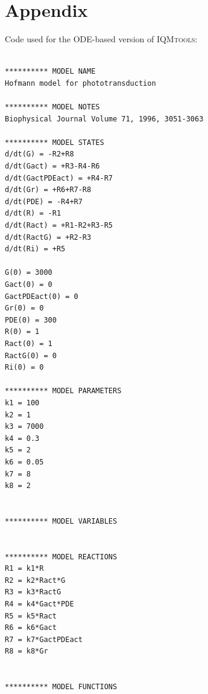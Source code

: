 \documentclass[pdf, color,12pt]{CITnote}
\begin{document}
\section{{\large Appendix}}
Code used for the ODE-based version of \textsc{IQMtools}:
\\
\\
\begin{lstlisting}
********** MODEL NAME
Hofmann model for phototransduction

********** MODEL NOTES
Biophysical Journal Volume 71, 1996, 3051-3063

********** MODEL STATES
d/dt(G) = -R2+R8 
d/dt(Gact) = +R3-R4-R6 
d/dt(GactPDEact) = +R4-R7 
d/dt(Gr) = +R6+R7-R8 
d/dt(PDE) = -R4+R7 
d/dt(R) = -R1 
d/dt(Ract) = +R1-R2+R3-R5 
d/dt(RactG) = +R2-R3 
d/dt(Ri) = +R5 

G(0) = 3000
Gact(0) = 0
GactPDEact(0) = 0
Gr(0) = 0
PDE(0) = 300
R(0) = 1
Ract(0) = 1
RactG(0) = 0
Ri(0) = 0

********** MODEL PARAMETERS
k1 = 100 
k2 = 1 
k3 = 7000 
k4 = 0.3 
k5 = 2 
k6 = 0.05 
k7 = 8 
k8 = 2 


********** MODEL VARIABLES


********** MODEL REACTIONS
R1 = k1*R
R2 = k2*Ract*G
R3 = k3*RactG
R4 = k4*Gact*PDE
R5 = k5*Ract
R6 = k6*Gact
R7 = k7*GactPDEact
R8 = k8*Gr


********** MODEL FUNCTIONS

\end{lstlisting}
\end{document}
